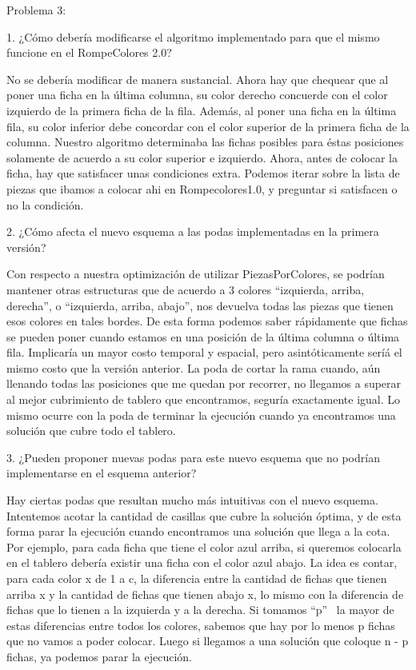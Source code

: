 \documentclass[11pt, a4paper, twoside]{article}
\begin{document}
{}

Problema 3:

1. ¿Cómo debería modificarse el algoritmo implementado para que el mismo funcione en el RompeColores 2.0?

No se debería modificar de manera sustancial. Ahora hay que chequear que al
poner una ficha en la última columna, su color derecho concuerde con el color
izquierdo de la primera ficha de la fila. Además, al poner una ficha en la
última fila, su color inferior debe concordar con el color superior de la
primera ficha de la columna. Nuestro algoritmo determinaba las fichas posibles
para éstas posiciones solamente de acuerdo a su color superior e izquierdo.
Ahora, antes de colocar la ficha, hay que satisfacer unas condiciones extra.
Podemos iterar sobre la lista de piezas que ibamos a colocar ahi en
Rompecolores1.0, y preguntar si satisfacen o no la condición.

2. ¿Cómo afecta el nuevo esquema a las podas implementadas en la primera versión?

Con respecto a nuestra optimización de utilizar PiezasPorColores, se podrían
mantener otras estructuras que de acuerdo a 3 colores ``izquierda, arriba,
derecha'', o ``izquierda, arriba, abajo'', nos devuelva todas las piezas que
tienen esos colores en tales bordes. De esta forma podemos saber rápidamente que
fichas se pueden poner cuando estamos en una posición de la última columna o
última fila. Implicaría un mayor costo temporal y espacial, pero asintóticamente
seríá el mismo costo que la versión anterior. La poda de cortar la rama cuando,
aún llenando todas las posiciones que me quedan por recorrer, no llegamos a
superar al mejor cubrimiento de tablero que encontramos, seguría exactamente
igual. Lo mismo ocurre con la poda de terminar la ejecución cuando ya
encontramos una solución que cubre todo el tablero.

3. ¿Pueden proponer nuevas podas para este nuevo esquema que no podrían implementarse en el esquema anterior?

Hay ciertas podas que resultan mucho más intuitivas con el nuevo esquema.
Intentemos acotar la cantidad de casillas que cubre la solución óptima, y de
esta forma parar la ejecución cuando encontramos una solución que llega a la
cota. Por ejemplo, para cada ficha que tiene el color azul arriba, si queremos
colocarla en el tablero debería existir una ficha con el color azul abajo. La
idea es contar, para cada color x de 1 a c, la diferencia entre la cantidad de
fichas que tienen arriba x y la cantidad de fichas que tienen abajo x, lo mismo
con la diferencia de fichas que lo tienen a la izquierda y a la derecha. Si
tomamos ``p''~ la mayor de estas diferencias entre todos los colores, sabemos
que hay por lo menos p fichas que no vamos a poder colocar. Luego si llegamos a
una solución que coloque n - p fichas, ya podemos parar la ejecución.

\end{document}
